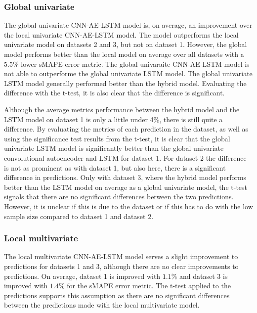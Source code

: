 \subsubsection{Global univariate}
\label{section:discussion&results:experiment-results:CNN-AE-LSTM:Global-Univariate}
The global univariate CNN-AE-LSTM model is, on average, an improvement over the local univariate CNN-AE-LSTM model.
The model outperforms the local univariate model on datasets 2 and 3, but not on dataset 1.
However, the global model performs better than the local model on average over all datasets with
a $5.5\%$ lower sMAPE error metric.
The global univaraite CNN-AE-LSTM model is not able to outperforme the global univariate LSTM model.
The global univariate LSTM model generally performed better than the hybrid model.
Evaluating the difference with the t-test, it is also clear that the difference is significant.

Although the average metrics performance between the hybrid model and the LSTM model on dataset 1 is only a little under 4\%,
there is still quite a difference.
By evaluating the metrics of each prediction in the dataset, as well as using the significance test results from the t-test,
it is clear that the global univariate LSTM model is significantly better than the global univariate convolutional autoencoder and LSTM for dataset 1.
For dataset 2 the difference is not as prominent as with dataset 1, but also here, there is a significant difference in predictions.
Only with dataset 3, where the hybrid model performs better than the LSTM model on average as a global univariate model,
the t-test signals that there are no significant differences between the two predictions.
However, it is unclear if this is due to the dataset or if this has to do with the low sample size compared to dataset 1 and dataset 2.




\subsubsection{Local multivariate}
\label{section:discussion&results:experiment-results:CNN-AE-LSTM:Local-Multivariate}
The local multivariate CNN-AE-LSTM model serves a slight improvement to predictions for datasets 1 and 3,
although there are no clear improvements to predictions.
On average, dataset 1 is improved with $1.1\%$ and dataset 3 is improved with $1.4\%$ for the sMAPE error metric.
The t-test applied to the predictions supports this assumption as there are no significant
differences between the predictions made with the local multivariate model.


